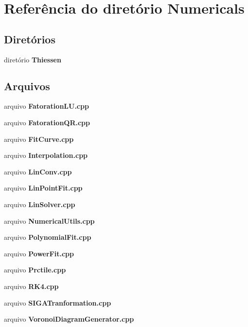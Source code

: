 \section{Referência do diretório Numericals}
\label{dir_1046a9fd1be960f829d6de0b1cd63b24}
\subsection*{Diretórios}
\begin{DoxyCompactItemize}
\item 
diretório {\bf Thiessen}
\end{DoxyCompactItemize}
\subsection*{Arquivos}
\begin{DoxyCompactItemize}
\item 
arquivo {\bf Fatoration\+L\+U.\+cpp}
\item 
arquivo {\bf Fatoration\+Q\+R.\+cpp}
\item 
arquivo {\bf Fit\+Curve.\+cpp}
\item 
arquivo {\bf Interpolation.\+cpp}
\item 
arquivo {\bf Lin\+Conv.\+cpp}
\item 
arquivo {\bf Lin\+Point\+Fit.\+cpp}
\item 
arquivo {\bf Lin\+Solver.\+cpp}
\item 
arquivo {\bf Numerical\+Utils.\+cpp}
\item 
arquivo {\bf Polynomial\+Fit.\+cpp}
\item 
arquivo {\bf Power\+Fit.\+cpp}
\item 
arquivo {\bf Prctile.\+cpp}
\item 
arquivo {\bf R\+K4.\+cpp}
\item 
arquivo {\bf S\+I\+G\+A\+Tranformation.\+cpp}
\item 
arquivo {\bf Voronoi\+Diagram\+Generator.\+cpp}
\end{DoxyCompactItemize}
